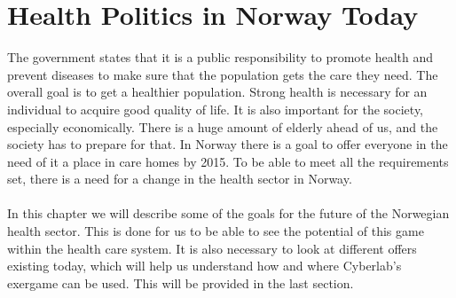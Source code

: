\chapter{Health Politics in Norway Today}
The government states that it is a public responsibility to promote health and prevent diseases to make sure that the population gets the care they need. The overall goal is to get a healthier population. Strong health is necessary for an individual to acquire good quality of life. It is also important for the society, especially economically. There is a huge amount of elderly ahead of us, and the society has to prepare for that. In Norway there is a goal to offer everyone in the need of it a place in care homes by 2015.  To be able to meet all the requirements set, there is a need for a change in the health sector in Norway.\\ \\
In this chapter we will describe some of the goals for the future of the Norwegian health sector. This is done for us to be able to see the potential of this game within the health care system.  It is also necessary to look at different offers existing today, which will help us understand how and where Cyberlab's exergame can be used. This will be provided in the last section. 

